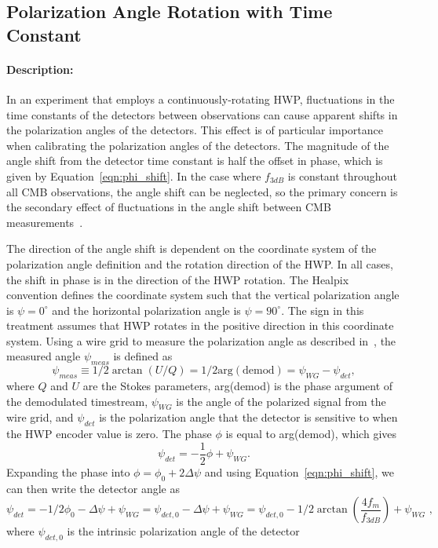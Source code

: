 \subsection{Polarization Angle Rotation with Time Constant}

\paragraph{Description:}
In an experiment that employs a continuously-rotating HWP, fluctuations in the time constants of the detectors between observations can cause apparent shifts in the polarization angles of the detectors. This effect is of particular importance when calibrating the polarization angles of the detectors. The magnitude of the angle shift from the detector time constant is half the offset in phase, which is given by Equation~\ref{eqn:phi_shift}. In the case where $f_{3dB}$ is constant throughout all CMB observations, the angle shift can be neglected, so the primary concern is the secondary effect of fluctuations in the angle shift between CMB measurements~\cite{Simon_Thesis_2016}.

The direction of the angle shift is dependent on the coordinate system of the polarization angle definition and the rotation direction of the HWP. In all cases, the shift in phase is in the direction of the HWP rotation. The Healpix convention defines the coordinate system such that the vertical polarization angle is $\psi=0^{\circ}$ and the horizontal polarization angle is $\psi=90^{\circ}$. The sign in this treatment assumes that HWP rotates in the positive direction in this coordinate system. Using a wire grid to measure the polarization angle as described in~\cite{Tajima_2012}, the measured angle $\psi_{meas}$ is defined as
\begin{equation}
\psi_{meas} \equiv 1/2 \arctan{(U/Q)}=1/2\mathrm{arg(demod)}=\psi_{WG}-\psi_{det},
\end{equation}
where $Q$ and $U$ are the Stokes parameters, arg(demod) is the phase argument of the demodulated timestream, $\psi_{WG}$ is the angle of the polarized signal from the wire grid, and $\psi_{det}$ is the polarization angle that the detector is sensitive to when the HWP encoder value is zero. The phase $\phi$ is equal to arg(demod), which gives
\begin{equation}
\psi_{det}=-\frac{1}{2}\phi + \psi_{WG}.
\end{equation}
Expanding the phase into $\phi=\phi_{0}+2\Delta \psi$ and using Equation~\ref{eqn:phi_shift}, we can then write the detector angle as
\begin{equation}
\psi_{det}=-1/2\phi_{0}-\Delta \psi+ \psi_{WG}=\psi_{det,0}-\Delta \psi + \psi_{WG}=\psi_{det,0}-1/2\arctan{\left(\frac{4f_{m}}{f_{3dB}}\right)} + \psi_{WG}\,\, ,
\end{equation}
where $\psi_{det,0}$ is the intrinsic polarization angle of the detector~\cite{Simon_Thesis_2016}

